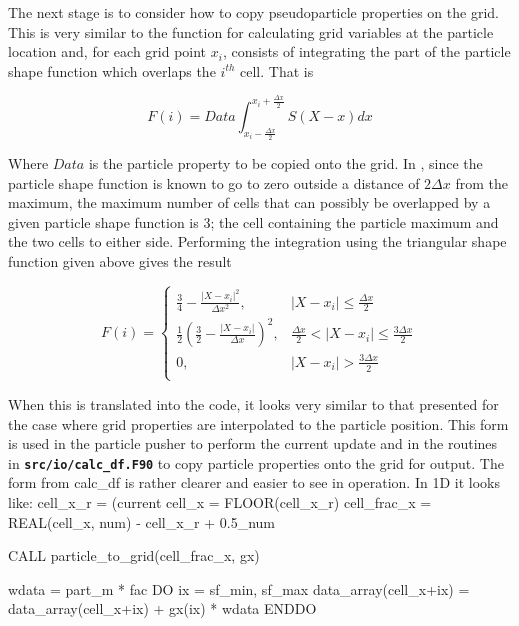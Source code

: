 \documentclass[12pt,a4paper]{article}
\newcommand{\inlinecode}[1]{{\color{warwickred} \bf\texttt{#1}}}
\newcommand{\EPOCH}{{\color{warwickdark}\fontfamily{phv}\selectfont{EPOCH}}}
\newenvironment{boxverbatim}{\lboxverbatim{none}}{\endlboxverbatim}
\begin{document}
The next stage is to consider how to copy pseudoparticle
properties on the grid. This is very similar to the function for calculating
grid variables at the particle location and, for each grid point $x_i$,
consists of integrating the part of the particle shape function which overlaps
the $i^{th}$ cell. That is

\[
F(i) = Data  \int^{x_i+\frac{\Delta x}{2}}_{x_i-\frac{\Delta x}{2}} S(X-x) dx
\]

Where $Data$ is the particle property to be copied onto the grid. In {\EPOCH},
since the particle shape function is known to go to zero outside a distance of
$2 \Delta x$ from the maximum, the maximum number of cells that can possibly be
overlapped by a given particle shape function is 3; the cell containing the
particle maximum and the two cells to either side. Performing the integration
using the triangular shape function given above gives the result

\[
  F(i) =
\begin{cases}
  \frac{3}{4} - \frac{|X-x_i|^2}{\Delta x^2}, & |X-x_i|
    \le \frac{\Delta x}{2}\\
  \frac{1}{2} \left(\frac{3}{2}
    - \frac{|X - x_i|}{\Delta x} \right)^2, & \frac{\Delta x}{2} < |X-x_i|
    \le \frac{3 \Delta x}{2}\\
  0, & |X-x_i| > \frac{3 \Delta x}{2}\\
\end{cases}
\]


When this is translated into the code, it looks very similar to that presented
for the case where grid properties are interpolated to the particle
position. This form is used in the particle pusher to perform the current
update and in the routines in \inlinecode{src/io/calc\_df.F90} to copy particle
properties onto the grid for output. The form from calc\_df is rather clearer
and easier to see in operation. In 1D it looks like:
\begin{boxverbatim}
  cell_x_r = (current%
  cell_x = FLOOR(cell_x_r)
  cell_frac_x = REAL(cell_x, num) - cell_x_r + 0.5_num

  CALL particle_to_grid(cell_frac_x, gx)

  wdata = part_m * fac
  DO ix = sf_min, sf_max
    data_array(cell_x+ix) = data_array(cell_x+ix) + gx(ix) * wdata
  ENDDO
\end{boxverbatim}
\end{document}
